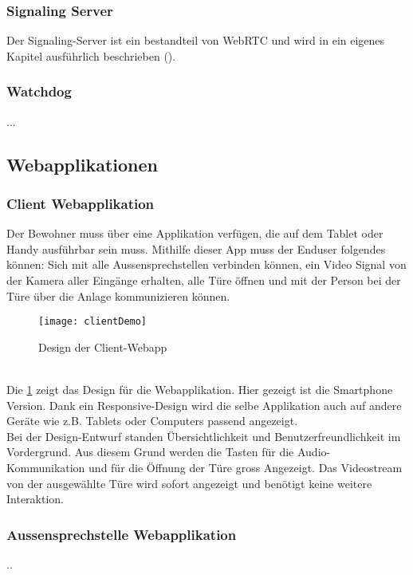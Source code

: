 \subsubsection{Signaling Server}
Der Signaling-Server ist ein bestandteil von WebRTC und wird in ein eigenes Kapitel ausführlich beschrieben ().

\subsubsection{Watchdog}
...

\subsection{Webapplikationen}
\label{kap:webapp}


\subsubsection{Client Webapplikation}
Der Bewohner muss über eine Applikation verfügen, die auf dem Tablet oder Handy ausführbar sein muss. Mithilfe dieser App muss der Enduser folgendes können: Sich mit alle Aussensprechstellen verbinden können, ein Video Signal von der Kamera aller Eingänge erhalten, alle Türe öffnen und mit der Person bei der Türe über die Anlage kommunizieren können.
\\
\begin{figure}[htb!]
	\begin{center}
		\texttt{[image: clientDemo]}
		\caption[Design der Client-Webapp]{Design der Client-Webapp}
		\label{fig:clientDemo}
	\end{center}
\end{figure}
\\
Die \cref{fig:clientDemo} zeigt das Design für die Webapplikation. Hier gezeigt ist die Smartphone Version. Dank ein Responsive-Design wird die selbe Applikation auch auf andere Geräte wie z.B. Tablets oder Computers passend angezeigt.
\\ 
Bei der Design-Entwurf standen Übersichtlichkeit und Benutzerfreundlichkeit im Vordergrund. Aus diesem Grund werden die Tasten für die Audio-Kommunikation und für die Öffnung der Türe gross Angezeigt. Das Videostream von der ausgewählte Türe wird sofort angezeigt und benötigt keine weitere Interaktion. 

\subsubsection{Aussensprechstelle Webapplikation}
..

